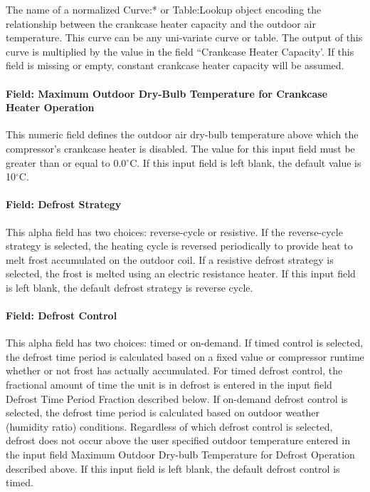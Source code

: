 The name of a normalized Curve:* or Table:Lookup object encoding the relationship between the crankcase heater capacity and the outdoor air temperature. This curve can be any uni-variate curve or table. The output of this curve is multiplied by the value in the field ``Crankcase Heater Capacity'. If this field is missing or empty, constant crankcase heater capacity will be
assumed.

\paragraph{Field: Maximum Outdoor Dry-Bulb Temperature for Crankcase Heater Operation}\label{field-maximum-outdoor-dry-bulb-temperature-for-crankcase-heater-operation-6}

This numeric field defines the outdoor air dry-bulb temperature above which the compressor's crankcase heater is disabled. The value for this input field must be greater than or equal to 0.0$^\circ$C. If this input field is left blank, the default value is 10$^\circ$C.

\paragraph{Field: Defrost Strategy}\label{field-defrost-strategy-2}

This alpha field has two choices: reverse-cycle or resistive. If the reverse-cycle strategy is selected, the heating cycle is reversed periodically to provide heat to melt frost accumulated on the outdoor coil. If a resistive defrost strategy is selected, the frost is melted using an electric resistance heater. If this input field is left blank, the default defrost strategy is reverse cycle.

\paragraph{Field: Defrost Control}\label{field-defrost-control-2}

This alpha field has two choices: timed or on-demand. If timed control is selected, the defrost time period is calculated based on a fixed value or compressor runtime whether or not frost has actually accumulated. For timed defrost control, the fractional amount of time the unit is in defrost is entered in the input field Defrost Time Period Fraction described below. If on-demand defrost control is selected, the defrost time period is calculated based on outdoor weather (humidity ratio) conditions. Regardless of which defrost control is selected, defrost does not occur above the user specified outdoor temperature entered in the input field Maximum Outdoor Dry-bulb Temperature for Defrost Operation described above. If this input field is left blank, the default defrost control is timed.

